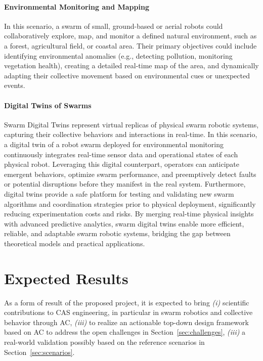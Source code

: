 \documentclass[12pt]{article}
\begin{document}
\paragraph{Environmental Monitoring and Mapping}
In this scenario, a swarm of small, ground-based or aerial robots could collaboratively explore, map, and monitor a defined natural environment, such as a forest, agricultural field, or coastal area. 
Their primary objectives could include identifying environmental anomalies (e.g., detecting pollution, monitoring vegetation health), creating a detailed real-time map of the area, 
and dynamically adapting their collective movement based on environmental cues or unexpected events.

\paragraph{Digital Twins of Swarms}
Swarm Digital Twins represent virtual replicas of physical swarm robotic systems, capturing their collective behaviors and interactions in real-time. 
In this scenario, a digital twin of a robot swarm deployed for environmental monitoring continuously integrates real-time sensor data and operational states of each physical robot. 
Leveraging this digital counterpart, operators can anticipate emergent behaviors, optimize swarm performance, and preemptively detect faults or potential disruptions before they manifest in the real system. 
Furthermore, digital twins provide a safe platform for testing and validating new swarm algorithms and coordination strategies prior to physical deployment, significantly reducing experimentation costs and risks. 
By merging%
 real-time physical insights with advanced predictive analytics, swarm digital twins enable more efficient, reliable, and adaptable swarm robotic systems, bridging the gap between theoretical models and practical applications.

\section{Expected Results}
As a form of result of the proposed project, it is expected to bring \textit{(i)} scientific contributions to CAS engineering, in particular in swarm robotics and collective behavior through AC,
\textit{(iii)} to realize an actionable top-down design framework based on AC to address the open challenges in Section~\ref{sec:challenges}, \textit{(iii)} a real-world validation possibly based on the reference scenarios in Section~\ref{sec:scenarios}.
\end{document}
